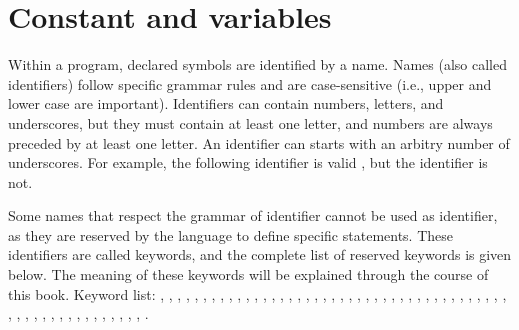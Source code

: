 \section{Constant and variables}

Within a program, declared symbols are identified by a name. Names (also called
identifiers) follow specific grammar rules and are case-sensitive (i.e., upper
and lower case are important). Identifiers can contain numbers, letters, and
underscores, but they must contain at least one letter, and numbers are always
preceded by at least one letter. An identifier can starts with an arbitry number
of underscores. For example, the following identifier is valid ,
but the identifier  is not.

\begin{center}
\end{center}

Some names that respect the grammar of identifier cannot be used as identifier,
as they are reserved by the language to define specific statements. These
identifiers are called keywords, and the complete list of reserved keywords is
given below. The meaning of these keywords will be explained through the course
of this book. Keyword list: , , ,
, , , , ,
, , , , , ,
, , , , ,
, , , , ,
, , , , , ,
, , , , ,
, , , , ,
, , , , ,
, , , , ,
, , , , ,
, , .

\vfill%
